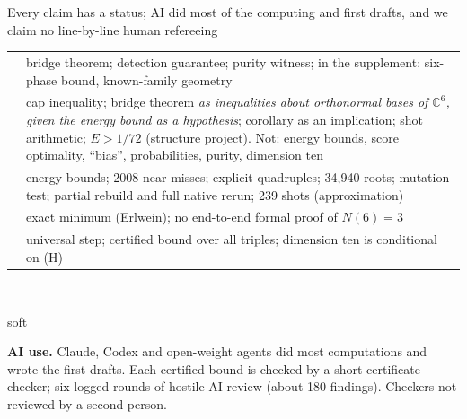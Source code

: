 \documentclass[aspectratio=169,11pt,t]{beamer}
\newcommand{\tg}[2]{{\setlength{\fboxsep}{1.2pt}\colorbox{#1}{\textcolor{white}{\sffamily\bfseries\footnotesize\,#2\,}}}}
\newcommand{\Tproved}{\tg{cProved}{proved}}
\newcommand{\Tleanh}{\tg{cLeanH}{Lean-checked}}
\newcommand{\Tcert}{\tg{cCert}{certified / computed}}
\newcommand{\Tcited}{\tg{cCited}{cited}}
\newcommand{\Topen}{\tg{cOpen}{open}}
\newcommand{\C}{\mathbb{C}}
\begin{document}
\begin{frame}{Every claim has a status; AI did most of the computing and first drafts, and we claim no line-by-line human refereeing}
\centering\footnotesize
\renewcommand{\arraystretch}{1.02}
\begin{tabular}{@{}>{\raggedright\arraybackslash}p{4.6cm}>{\raggedright\arraybackslash}p{9.5cm}@{}}
\toprule
\Tproved & bridge theorem; detection guarantee; purity witness; in the supplement: six-phase bound, known-family geometry\\
\Tleanh & cap inequality; bridge theorem \emph{as inequalities about orthonormal bases of $\C^6$, given the energy bound as a hypothesis}; corollary as an implication; shot arithmetic; $E>1/72$ (structure project). Not: energy bounds, score optimality, ``bias'', probabilities, purity, dimension ten\\
\Tcert & energy bounds; 2008 near-misses; explicit quadruples; 34,940 roots; mutation test; partial rebuild and full native rerun; 239 shots (approximation)\\
\Tcited & exact minimum (Erlwein); no end-to-end formal proof of $N(6)=3$\\
\Topen & universal step; certified bound over all triples; dimension ten is conditional on (H)\\
\bottomrule
\end{tabular}\\[0.1cm]
\begin{beamercolorbox}[wd=\textwidth,sep=3pt,rounded=true]{soft}
\raggedright\footnotesize\textbf{AI use.} Claude, Codex and open-weight agents did most computations and wrote the first drafts. Each certified bound is checked by a short certificate checker; six logged rounds of hostile AI review (about 180 findings). Checkers not reviewed by a second person.
\end{beamercolorbox}
\end{frame}
\end{document}
